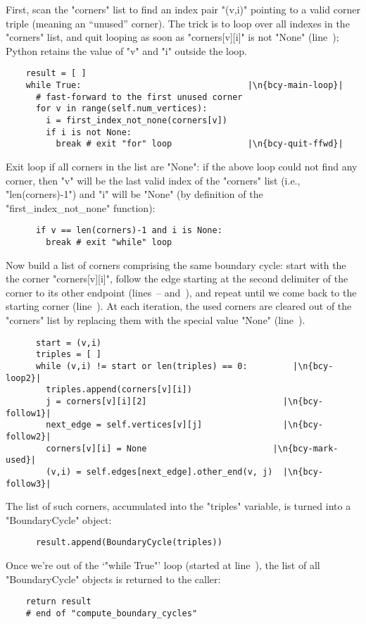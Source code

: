 First, scan the "corners" list to find an index pair "(v,i)" pointing
to a valid corner triple (meaning an ``unused'' corner). The trick is
to loop over all indexes in the "corners" list, and quit looping as
soon as "corners[v][i]" is not "None" (line~);
Python retains the value of "v" and "i" outside the loop.
\begin{lstlisting}
    result = [ ]
    while True:                                 |\n{bcy-main-loop}|
      # fast-forward to the first unused corner
      for v in range(self.num_vertices):
        i = first_index_not_none(corners[v])
        if i is not None:
          break # exit "for" loop               |\n{bcy-quit-ffwd}|

\end{lstlisting}
Exit loop if all corners in the list are "None": if the above loop
could not find any corner, then "v" will be the last valid index of
the "corners" list (i.e., "len(corners)-1") and "i" will be "None" (by
definition of the "first_index_not_none" function):
\begin{lstlisting}
      if v == len(corners)-1 and i is None:
        break # exit "while" loop

\end{lstlisting}
Now build a list of corners comprising the same boundary cycle: start
with the the corner "corners[v][i]", follow the edge starting at the
second delimiter of the corner to its other endpoint
(lines~-- and~), and
repeat until we come back to the starting corner
(line~). At each iteration, the used corners are cleared
out of the "corners" list by replacing them with the special value
"None" (line~).
\begin{lstlisting}
      start = (v,i)
      triples = [ ]
      while (v,i) != start or len(triples) == 0:         |\n{bcy-loop2}|
        triples.append(corners[v][i])
        j = corners[v][i][2]                           |\n{bcy-follow1}|
        next_edge = self.vertices[v][j]                |\n{bcy-follow2}|
        corners[v][i] = None                         |\n{bcy-mark-used}|
        (v,i) = self.edges[next_edge].other_end(v, j)  |\n{bcy-follow3}|
\end{lstlisting}
The list of such corners, accumulated into the "triples" variable, is
turned into a "BoundaryCycle" object:
\begin{lstlisting}
      result.append(BoundaryCycle(triples))

\end{lstlisting}
Once we're out of the `"while True"' loop (started at
line~), the list of all "BoundaryCycle" objects
is returned to the caller:
\begin{lstlisting}
    return result
    # end of "compute_boundary_cycles"
    
\end{lstlisting}


